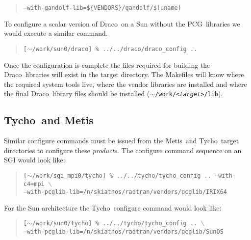 \documentclass[10pt]{nmemo}
\newcommand{\comp}[1]{\normalfont\normalsize\texttt{#1}}
\newcommand{\draco}{{\normalfont\sffamily Draco}}
\newcommand{\tycho}{{\normalfont\sffamily Tycho}}
\newcommand{\metis}{{\normalfont\sffamily Metis}}
\newcommand{\pcg}{{\normalfont\sffamily PCG}}
\begin{document}
\footnotesize
\begin{verse}
\texttt{--with-gandolf-lib=\$\{VENDORS\}/gandolf/\$(uname)}
\end{verse}
\normalsize

To configure a scalar version of \draco\ on a Sun without the \pcg\ 
libraries we would execute a similar command.

\footnotesize
\begin{verse}
\texttt{[$\sim$/work/sun0/draco] \% ../../draco/draco\_config .. }\\
\end{verse}
\normalsize

Once the configuration is complete the files required for building the 
\draco\ libraries will exist in the target directory.  The Makefiles
will know where the required system tools live, where the vendor
libraries are installed and where the final \draco\ library files
should be installed (\comp{$\sim$/work/<\emph{target}>/lib}).

\subsection{\tycho\ and \metis}

Similar configure commands must be issued from the \metis\ and \tycho\ 
target directories to configure these \emph{products}.  The configure
command sequence on an SGI would look like:

\footnotesize
\begin{verse}
\texttt{[$\sim$/work/sgi\_mpi0/tycho] \% ../../tycho/tycho\_config 
.. --with-c4=mpi $\backslash$\\
\hspace{0.5in}--with-pcglib-lib=/n/skiathos/radtran/vendors/pcglib/IRIX64}
\end{verse}
\normalsize

For the Sun architecture the \tycho\ configure command would look
like:

\footnotesize
\begin{verse}
\texttt{[$\sim$/work/sun0/tycho] \% ../../tycho/tycho\_config 
.. $\backslash$\\
\hspace{0.5in}--with-pcglib-lib=/n/skiathos/radtran/vendors/pcglib/SunOS}
\end{verse}
\normalsize
\end{document}
